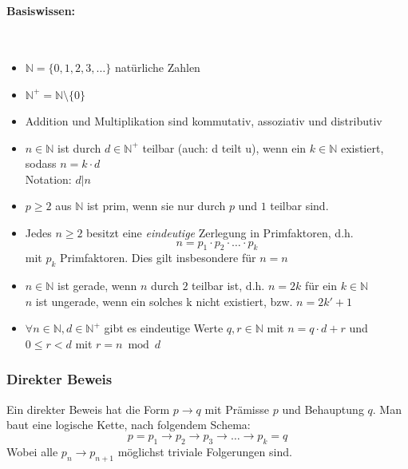 \paragraph{Basiswissen:}
\ \\
\begin{itemize}
\item $\mathbb{N} = \{0,1,2,3,\ldots\}$ natürliche Zahlen
\item $\mathbb{N}^{+} = \mathbb{N}\setminus\{0\}$
\item Addition und Multiplikation sind kommutativ, assoziativ und distributiv
\item $n\in\mathbb{N}$ ist durch $d\in\mathbb{N}^+$ teilbar (auch: \glqq d teilt u\grqq ), wenn ein $k\in\mathbb{N}$ existiert, sodass $n=k\cdot d$\\
Notation: $d|n$
\item $p\geq 2$ aus $\mathbb{N}$ ist prim, wenn sie nur durch $p$ und $1$ teilbar sind.
\item Jedes $n\geq 2$ besitzt eine \emph{eindeutige} Zerlegung in Primfaktoren, d.h.
\[
n = p_1 \cdot p_2 \cdot \ldots \cdot p_k
\]
mit $p_k$ Primfaktoren. Dies gilt insbesondere f\"ur $n=n$
\item $n\in\mathbb{N}$ ist gerade, wenn $n$ durch $2$ teilbar ist, d.h. $n=2k$ für ein $k\in\mathbb{N}$\\
$n$ ist ungerade, wenn ein solches k nicht existiert, bzw. $n=2k'+1$
\item $\forall n\in\mathbb{N},d\in\mathbb{N}^{+}$ gibt es eindeutige Werte $q,r\in\mathbb{N}$ mit $n=q\cdot d+r$ und $0\leq r< d$ mit $r=n\bmod d$
\end{itemize}

\subsubsection{Direkter Beweis}
Ein direkter Beweis hat die Form $p\rightarrow q$ mit Prämisse $p$ und Behauptung $q$. Man baut eine \glqq logische Kette\grqq , nach folgendem Schema:
\[
p=p_1\rightarrow p_2 \rightarrow p_3 \rightarrow \ldots \rightarrow p_k=q
\]
Wobei alle $p_n\rightarrow p_{n+1}$ möglichst triviale Folgerungen sind.

